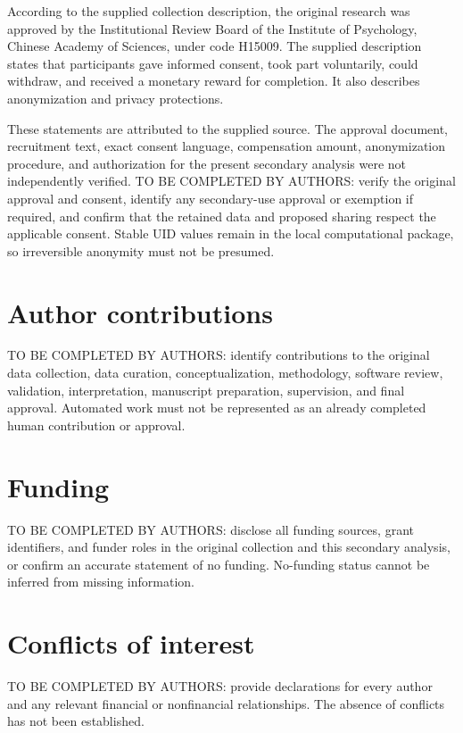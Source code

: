 \documentclass[11pt,letterpaper]{article}
\begin{document}
According to the supplied collection description, the original research was approved by the Institutional Review Board of the Institute of Psychology, Chinese Academy of Sciences, under code H15009. The supplied description states that participants gave informed consent, took part voluntarily, could withdraw, and received a monetary reward for completion. It also describes anonymization and privacy protections.

These statements are attributed to the supplied source. The approval document, recruitment text, exact consent language, compensation amount, anonymization procedure, and authorization for the present secondary analysis were not independently verified. TO BE COMPLETED BY AUTHORS: verify the original approval and consent, identify any secondary-use approval or exemption if required, and confirm that the retained data and proposed sharing respect the applicable consent. Stable UID values remain in the local computational package, so irreversible anonymity must not be presumed.

\section{Author contributions}\label{author-contributions}

TO BE COMPLETED BY AUTHORS: identify contributions to the original data collection, data curation, conceptualization, methodology, software review, validation, interpretation, manuscript preparation, supervision, and final approval. Automated work must not be represented as an already completed human contribution or approval.

\section{Funding}\label{funding}

TO BE COMPLETED BY AUTHORS: disclose all funding sources, grant identifiers, and funder roles in the original collection and this secondary analysis, or confirm an accurate statement of no funding. No-funding status cannot be inferred from missing information.

\section{Conflicts of interest}\label{conflicts-of-interest}

TO BE COMPLETED BY AUTHORS: provide declarations for every author and any relevant financial or nonfinancial relationships. The absence of conflicts has not been established.
\end{document}
